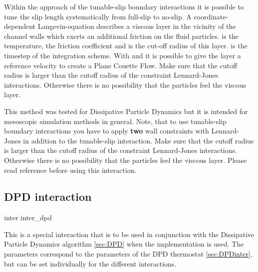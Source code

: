 Within the approach of the tunable-slip boundary interactions it is
possible to tune the slip length systematically from full-slip to
no-slip.  A coordinate-dependent Langevin-equation describes a viscous
layer in the vicinity of the channel walls which exerts an additional
friction on the fluid particles.   is the temperature,
 the friction coefficient and  is
the cut-off radius of this layer.  is the timestep of
the integration scheme. With   and  it is
possible to give the layer a reference velocity to create a Plane
Couette Flow.  Make sure that the cutoff radius 
is larger than the cutoff radius of the constraint Lennard-Jones
interactions. Otherwise there is no possibility that the particles
feel the viscous layer.

This method was tested for Dissipative Particle Dynamics but it is
intended for mesoscopic simulation methods in general. Note, that to
use tunable-slip boundary interactions you have to apply \textbf{two}
wall constraints with Lennard-Jones in addition to the
tunable-slip interaction. Make sure that the cutoff radius
 is larger than the cutoff radius of the
constraint Lennard-Jones interactions. Otherwise there is no
possibility that the particles feel the viscous layer.  Please read
reference \cite{smiatek08a} before using this interaction.

\subsection{DPD interaction}\label{sec:DPDinter}

\begin{essyntax}
  inter   inter_dpd       
  \begin{features}
  \end{features}
\end{essyntax}

This is a special interaction that is to be used in conjunction with
the Dissipative Particle Dynamics algorithm \ref{sec:DPD} when the
 implementation is used. The parameters correspond
to the parameters of the DPD thermostat \vref{sec:DPDinter}, but can
be set individually for the different interactions.

